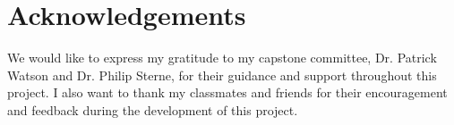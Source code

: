 \documentclass[11pt]{article}
\begin{document}
\tableofcontents
\clearpage

\twocolumn

\maketitle
%

%

%
%
%

\section*{Acknowledgements}
We would like to express my gratitude to my capstone committee, Dr. Patrick Watson and Dr. Philip Sterne, for their guidance and support throughout this project. I also want to thank my classmates and friends for their encouragement and feedback during the development of this project.

\clearpage

\end{document}
